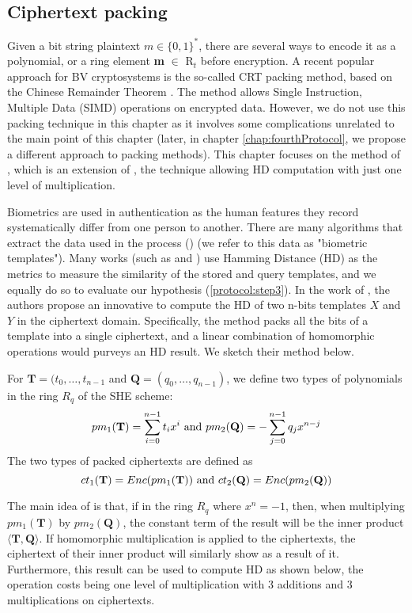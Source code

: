 \subsection{Ciphertext packing}
\label{sub:ciphertext_packing}
Given a bit string plaintext $m \in \{0,1\}^*$, there are several ways to encode
it as a polynomial, or a ring element \textbf{m} $\in$ R$_{t}$ before
encryption. A recent popular approach for BV cryptosystems is the so-called CRT
packing method, based on the Chinese Remainder Theorem
\cite{smart2014fully}. The method allows Single Instruction, Multiple Data
(SIMD) operations on encrypted data. However, we do not use this packing
technique in this chapter as it involves some complications unrelated to the
main point of this chapter (later, in chapter \ref{chap:fourthProtocol}, we
propose a different approach to packing methods). This chapter focuses on the
method of \cite{yasuda2014practical}, which is an extension of
\cite{naehrig2011can}, the technique allowing HD computation with just one level
of multiplication.

Biometrics are used in authentication as the human features they record
systematically differ from one person to another. There are many algorithms that
extract the data used in the process (\cite{FVConGoi2:online}) (we refer to this
data as "biometric templates"). Many works (such as \cite{daugman2003importance}
and \cite{FujitsuD7:online}) use Hamming Distance (HD) as the metrics to measure
the similarity of the stored and query templates, and we equally do so to
evaluate our hypothesis (\ref{protocol:step3}). In the work of
\cite{yasuda2014practical}, the authors propose an innovative to compute the HD
of two n-bits templates $X$ and $Y$ in the ciphertext domain. Specifically, the
method packs all the bits of a template into a single ciphertext, and a linear
combination of homomorphic operations would purveys an HD result. We sketch
their method below.
\begin{definition} 
  For $\mathbf{T} = (t_0, \dots, t_{n-1}$ and
  $\mathbf{Q} = (q_0, \dots, q_{n-1})$, we define two types of polynomials in
  the ring $R_q$ of the SHE scheme:
  \[
    pm_1(\mathbf{T}) = \sum_{i=0}^{n-1}t_ix^i \ \textnormal{and} \
    pm_2(\mathbf{Q}) = - \sum_{j=0}^{n-1}q_jx^{n-j}
  \]
  The two types of packed ciphertexts are defined as
  \[
    ct_{1}(\mathbf{T}) = Enc(pm_1(\mathbf{T})) \ \textnormal{and} \
    ct_{2}(\mathbf{Q}) = Enc(pm_2(\mathbf{Q}))
  \]
\end{definition}
The main idea of \cite{yasuda2014practical} is that, if in the ring $R_q$ where
$x^n = -1$, then, when multiplying $pm_1(\mathbf{T})$ by $pm_2(\mathbf{Q})$, the
constant term of the result will be the inner product
$\langle \mathbf{T}, \mathbf{Q}\rangle$. If homomorphic multiplication is
applied to the ciphertexts, the ciphertext of their inner product will similarly
show as a result of it. Furthermore, this result can be used to compute HD as
shown below, the operation costs being one level of multiplication with 3
additions and 3 multiplications on ciphertexts.

